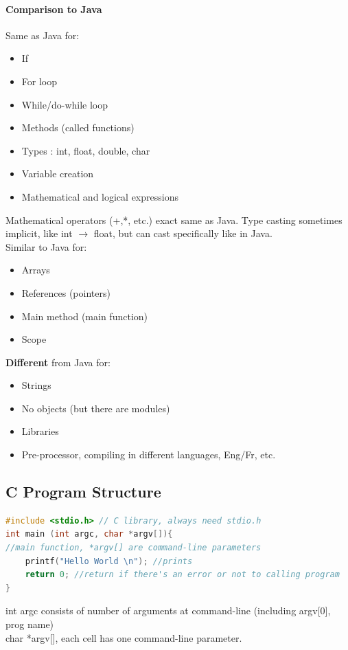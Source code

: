 \documentclass[12 pt]{article}
\begin{document}
\paragraph{Comparison to Java}
Same as Java for: 
\begin{itemize}
	\item If
	\item For loop
	\item While/do-while loop
	\item Methods (called functions)
	\item Types : int, float, double, char
	\item Variable creation
	\item Mathematical and logical expressions
	\end{itemize}
	Mathematical operators (+,*, etc.) exact same as Java. Type casting sometimes implicit, like int $\to$ float, but can cast specifically like in Java.
\\Similar to Java for:
\begin{itemize}
	\item Arrays
	\item References (pointers)
	\item Main method (main function)
	\item Scope
\end{itemize}
\textbf{Different} from Java for:
\begin{itemize}
	\item Strings
	\item No objects (but there are modules)
	\item Libraries
	\item Pre-processor, compiling in different languages, Eng/Fr, etc.
\end{itemize}
\subsection{C Program Structure}
\begin{lstlisting}[language=c]
#include <stdio.h> // C library, always need stdio.h
int main (int argc, char *argv[]){ 
//main function, *argv[] are command-line parameters
	printf("Hello World \n"); //prints
	return 0; //return if there's an error or not to calling program
}
\end{lstlisting}
int argc consists of number of arguments at command-line (including argv[0], prog name)
\\ char *argv[], each cell has one command-line parameter.
\end{document}
